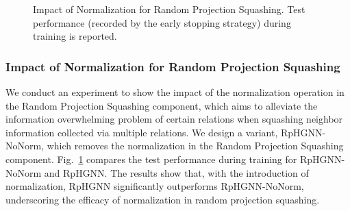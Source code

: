 \documentclass[lettersize,journal]{IEEEtran}
\begin{document}
\begin{table}[!tp]
\centering
\caption{
Impact of Different Random Projection Strategies.
In Sparse Random Projection (), , as defined by Equation~\ref{eq:rand_proj_squash}, denotes the sparsity of the random projection weight matrix, and larger  indicates a more sparse random projection weight matrix.
}
\label{tab:impact_random_proj_strategy}
\end{table}




\begin{figure}[!tp]
\centering
{}
\caption{
Impact of Normalization for Random Projection Squashing.
Test performance (recorded by the early stopping strategy) during training is reported.
}
\label{fig:impact_norm} \end{figure}









\subsubsection{Impact of Normalization for Random Projection Squashing}

We conduct an experiment to show the impact of the normalization operation in the Random Projection Squashing component, which aims to alleviate the information overwhelming problem of certain relations when squashing neighbor information collected via multiple relations.
We design a variant, RpHGNN-NoNorm, which removes the normalization in the Random Projection Squashing component.
Fig.~\ref{fig:impact_norm} compares the test performance during training for RpHGNN-NoNorm and RpHGNN.
The results show that, with the introduction of normalization, RpHGNN significantly outperforms RpHGNN-NoNorm, underscoring the efficacy of normalization in random projection squashing.
\end{document}
